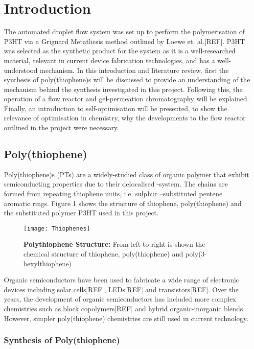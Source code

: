 \chapter{Introduction}

The automated droplet flow system was set up to perform the polymerisation of P3HT via a Grignard Metathesis method outlined by Loewe et. al.[REF]. P3HT was selected as the synthetic product for the system as it is a well-researched material, relevant in current device fabrication technologies, and has a well-understood mechanism. In this introduction and literature review, first the synthesis of poly(thiophene)s will be discussed to provide an understanding of the mechanism behind the synthesis investigated in this project. Following this, the operation of a flow reactor and gel-permeation chromatography will be explained. Finally, an introduction to self-optimisation will be presented, to show the relevance of optimisation in chemistry, why the developments to the flow reactor outlined in the project were necessary.

\section{Poly(thiophene) }
Poly(thiophene)s (PTs) are a widely-studied class of organic polymer that exhibit semiconducting properties due to their delocalised -system. The chains are formed from repeating thiophene units, i.e. sulphur –substituted pentene aromatic rings. Figure 1 shows the structure of thiophene, poly(thiophene) and the substituted polymer P3HT used in this project.

\begin{figure}[h]
\centering
\texttt{[image: Thiophenes]}
\caption{\textbf{Polythiophene Structure:} From left to right is shown the chemical structure of thiophene, poly(thiophene) and poly(3-hexylthiophene)
}
\centering
\end{figure}

Organic semiconductors have been used to fabricate a wide range of electronic devices including solar cells[REF], LEDs[REF] and transistors[REF]. Over the years, the development of organic semiconductors has included more complex chemistries such as block copolymers[REF] and hybrid organic-inorganic blends. However, simpler poly(thiophene) chemistries are still used in current technology.

\subsection{Synthesis of Poly(thiophene)}

